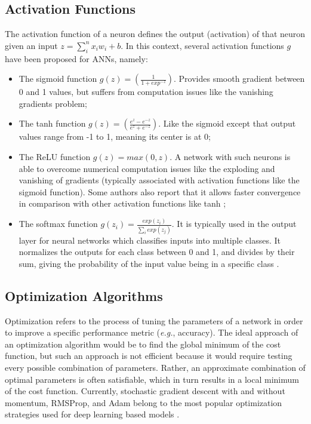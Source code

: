     \subsection{Activation Functions}
    The activation function of a neuron defines the output (activation) of that neuron given an input $z=\sum_{i}^{n} x_i w_i + b$. In this context, several activation functions $g$ have been proposed for \ac{ANN}s, namely:
    \begin{itemize}
        \item The sigmoid function $g(z) = (\frac{1}{1+exp^{-z}})$. Provides smooth gradient between 0 and 1 values, but suffers from computation issues like the vanishing gradients problem;
        
        \item The tanh function $g(z) = (\frac{e^z - e^{-z}}{e^z + e^{-z}}) $. Like the sigmoid except that output values range from -1 to 1, meaning its center is at 0;
        
        \item The ReLU function $g(z) = max(0, z)$. A network with such neurons is able to overcome numerical computation issues like the exploding and vanishing of gradients (typically associated with activation functions like the sigmoid function). Some authors also report that it allows faster convergence in comparison with other activation functions like tanh \cite{alexnet};
        
        \item The softmax function $g(z_i) = \frac{exp(z_i)}{\sum_{i}^{} exp(z_j)}$. It is typically used in the output layer for neural networks which classifies inputs into multiple classes. It normalizes the outputs for each class between 0 and 1, and divides by their sum, giving the probability of the input value being in a specific class \cite{Goodfellow-et-al-2016}.
    \end{itemize}
    
    \subsection{Optimization Algorithms}
    Optimization refers to the process of tuning the parameters of a network in order to improve a specific performance metric (\textit{e.g.}, accuracy). The ideal approach of an optimization algorithm would be to find the global minimum of the cost function, but such an approach is not efficient because it would require testing every possible combination of parameters. Rather, an approximate combination of optimal parameters is often satisfiable, which in turn results in a local minimum of the cost function. Currently, stochastic gradient descent with and without momentum, RMSProp, and Adam belong to the most popular optimization strategies used for deep learning based models \cite{Goodfellow-et-al-2016}. \par
    
